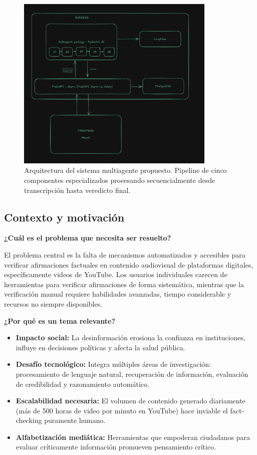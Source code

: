 \documentclass[12pt,a4paper,twoside]{book}
\begin{document}
\begin{figure}[h]
\centering
\includegraphics[width=0.85\textwidth]{./figs/system_architecture.png}
\caption{Arquitectura del sistema multiagente propuesto. Pipeline de cinco componentes especializados procesando secuencialmente desde transcripción hasta veredicto final.}
\label{fig:arquitectura}
\end{figure}

\subsection{Contexto y motivación}

\textbf{¿Cuál es el problema que necesita ser resuelto?}

El problema central es la falta de mecanismos automatizados y accesibles para verificar afirmaciones factuales en contenido audiovisual de plataformas digitales, específicamente videos de YouTube. Los usuarios individuales carecen de herramientas para verificar afirmaciones de forma sistemática, mientras que la verificación manual requiere habilidades avanzadas, tiempo considerable y recursos no siempre disponibles.

\textbf{¿Por qué es un tema relevante?}

\begin{itemize}
    \item \textbf{Impacto social:} La desinformación erosiona la confianza en instituciones, influye en decisiones políticas y afecta la salud pública.
    \item \textbf{Desafío tecnológico:} Integra múltiples áreas de investigación: procesamiento de lenguaje natural, recuperación de información, evaluación de credibilidad y razonamiento automático.
    \item \textbf{Escalabilidad necesaria:} El volumen de contenido generado diariamente (más de 500 horas de video por minuto en YouTube) hace inviable el fact-checking puramente humano.
    \item \textbf{Alfabetización mediática:} Herramientas que empoderan ciudadanos para evaluar críticamente información promueven pensamiento crítico.
\end{itemize}
\end{document}
